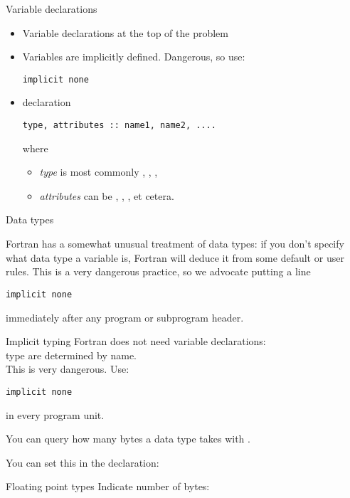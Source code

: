 \begin{slide}{Variable declarations}
  \label{sl:fvars}
  \begin{itemize}
  \item Variable declarations at the top of the problem
  \item Variables are implicitly defined. Dangerous, so use:
\begin{verbatim}
implicit none
\end{verbatim}
\item declaration
\begin{verbatim}
type, attributes :: name1, name2, ....
\end{verbatim}
where
\begin{itemize}
\item \textit{type} is most commonly , , ,
\item \textit{attributes} can be , ,
  ,  et cetera.
  \end{itemize}
\end{itemize}
\end{slide}

 {Data types}
\label{sec:ftype}

Fortran has a somewhat unusual treatment of data types: if you don't
specify what data type a variable is, Fortran will deduce it from some
default or user rules. This is a very dangerous practice, so we
advocate putting a line
\begin{verbatim}
implicit none
\end{verbatim}
immediately after any program or subprogram header.

\begin{slide}{Implicit typing}
  \label{sl:fimplicit}
  Fortran does not need variable declarations:\\
  type are determined by name.\\
  This is very dangerous. Use:
\begin{verbatim}
implicit none
\end{verbatim}
  in every program unit.
\end{slide}

You can query how many bytes a data type takes with
.

You can set this in the declaration:
%

\begin{slide}{Floating point types}
  \label{sl:ffloat}
  Indicate number of bytes:
\end{slide}

